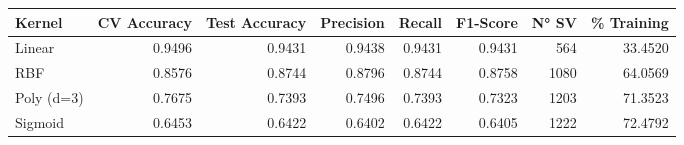 \begin{tabular}{lrrrrrrr}
\toprule
Kernel & CV Accuracy & Test Accuracy & Precision & Recall & F1-Score & N° SV & \% Training \\
\midrule
Linear & 0.9496 & 0.9431 & 0.9438 & 0.9431 & 0.9431 & 564 & 33.4520 \\
RBF & 0.8576 & 0.8744 & 0.8796 & 0.8744 & 0.8758 & 1080 & 64.0569 \\
Poly (d=3) & 0.7675 & 0.7393 & 0.7496 & 0.7393 & 0.7323 & 1203 & 71.3523 \\
Sigmoid & 0.6453 & 0.6422 & 0.6402 & 0.6422 & 0.6405 & 1222 & 72.4792 \\
\bottomrule
\end{tabular}
